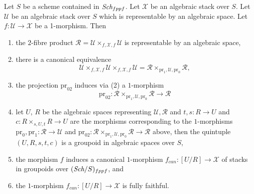 \begin{lemma}
\label{lemma-map-space-into-stack}
Let $S$ be a scheme contained in $\textit{Sch}_{fppf}$.
Let $\mathcal{X}$ be an algebraic stack over $S$.
Let $\mathcal{U}$ be an algebraic stack over $S$ which
is representable by an algebraic space.
Let $f : \mathcal{U} \to \mathcal{X}$ be a 1-morphism. Then
\begin{enumerate}
\item the $2$-fibre product
$\mathcal{R} = \mathcal{U} \times_{f, \mathcal{X}, f} \mathcal{U}$
is representable by an algebraic space,
\item there is a canonical equivalence
$$
\mathcal{U} \times_{f, \mathcal{X}, f} \mathcal{U}
\times_{f, \mathcal{X}, f} \mathcal{U} =
\mathcal{R} \times_{\text{pr}_1, \mathcal{U}, \text{pr}_0} \mathcal{R},
$$
\item the projection $\text{pr}_{02}$ induces via (2) a $1$-morphism
$$
\text{pr}_{02} :
\mathcal{R} \times_{\text{pr}_1, \mathcal{U}, \text{pr}_0} \mathcal{R}
\longrightarrow
\mathcal{R}
$$
\item let $U$, $R$ be the algebraic spaces representing
$\mathcal{U}, \mathcal{R}$ and $t, s : R \to U$ and
$c : R \times_{s, U, t} R \to U$ are the morphisms corresponding
to the $1$-morphisms
$\text{pr}_0, \text{pr}_1 : \mathcal{R} \to \mathcal{U}$
and
$\text{pr}_{02} :
\mathcal{R} \times_{\text{pr}_1, \mathcal{U}, \text{pr}_0} \mathcal{R} \to
\mathcal{R}$ above, then the quintuple $(U, R, s, t, c)$ is a groupoid in
algebraic spaces over $S$,
\item the morphism $f$ induces a canonical $1$-morphism
$f_{can} : [U/R] \to \mathcal{X}$
of stacks in groupoids over $(\textit{Sch}/S)_{fppf}$, and
\item the $1$-morphism $f_{can} : [U/R] \to \mathcal{X}$ is fully faithful.
\end{enumerate}
\end{lemma}

